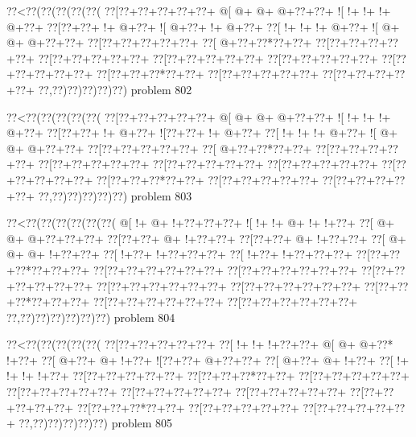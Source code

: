 \vbox{\vbox{\goo
\0??<\0??(\0??(\0??(\0??(\0??(
\0??[\0??+\0??+\0??+\0??+\0??+
\- @[\- @+\- @+\- @+\0??+\0??+
\- ![\- !+\- !+\- !+\- @+\0??+
\0??[\0??+\0??+\- !+\- @+\0??+
\- ![\- @+\0??+\- !+\- @+\0??+
\0??[\- !+\- !+\- !+\- @+\0??+
\- ![\- @+\- @+\- @+\0??+\0??+
\0??[\0??+\0??+\0??+\0??+\0??+
\0??[\- @+\0??+\0??*\0??+\0??+
\0??[\0??+\0??+\0??+\0??+\0??+
\0??[\0??+\0??+\0??+\0??+\0??+
\0??[\0??+\0??+\0??+\0??+\0??+
\0??[\0??+\0??+\0??+\0??+\0??+
\0??[\0??+\0??+\0??+\0??+\0??+
\0??[\0??+\0??+\0??*\0??+\0??+
\0??[\0??+\0??+\0??+\0??+\0??+
\0??[\0??+\0??+\0??+\0??+\0??+
\0??,\0??)\0??)\0??)\0??)\0??)
}
\hfil problem 802\hfil\break
}

\vbox{\vbox{\goo
\0??<\0??(\0??(\0??(\0??(\0??(
\0??[\0??+\0??+\0??+\0??+\0??+
\- @[\- @+\- @+\- @+\0??+\0??+
\- ![\- !+\- !+\- !+\- @+\0??+
\0??[\0??+\0??+\- !+\- @+\0??+
\- ![\0??+\0??+\- !+\- @+\0??+
\0??[\- !+\- !+\- !+\- @+\0??+
\- ![\- @+\- @+\- @+\0??+\0??+
\0??[\0??+\0??+\0??+\0??+\0??+
\0??[\- @+\0??+\0??*\0??+\0??+
\0??[\0??+\0??+\0??+\0??+\0??+
\0??[\0??+\0??+\0??+\0??+\0??+
\0??[\0??+\0??+\0??+\0??+\0??+
\0??[\0??+\0??+\0??+\0??+\0??+
\0??[\0??+\0??+\0??+\0??+\0??+
\0??[\0??+\0??+\0??*\0??+\0??+
\0??[\0??+\0??+\0??+\0??+\0??+
\0??[\0??+\0??+\0??+\0??+\0??+
\0??,\0??)\0??)\0??)\0??)\0??)
}
\hfil problem 803\hfil\break
}

\vbox{\vbox{\goo
\0??<\0??(\0??(\0??(\0??(\0??(\0??(
\- @[\- !+\- @+\- !+\0??+\0??+\0??+
\- ![\- !+\- !+\- @+\- !+\- !+\0??+
\0??[\- @+\- @+\- @+\0??+\0??+\0??+
\0??[\0??+\0??+\- @+\- !+\0??+\0??+
\0??[\0??+\0??+\- @+\- !+\0??+\0??+
\0??[\- @+\- @+\- @+\- !+\0??+\0??+
\0??[\- !+\0??+\- !+\0??+\0??+\0??+
\0??[\- !+\0??+\- !+\0??+\0??+\0??+
\0??[\0??+\0??+\0??*\0??+\0??+\0??+
\0??[\0??+\0??+\0??+\0??+\0??+\0??+
\0??[\0??+\0??+\0??+\0??+\0??+\0??+
\0??[\0??+\0??+\0??+\0??+\0??+\0??+
\0??[\0??+\0??+\0??+\0??+\0??+\0??+
\0??[\0??+\0??+\0??+\0??+\0??+\0??+
\0??[\0??+\0??+\0??*\0??+\0??+\0??+
\0??[\0??+\0??+\0??+\0??+\0??+\0??+
\0??[\0??+\0??+\0??+\0??+\0??+\0??+
\0??,\0??)\0??)\0??)\0??)\0??)\0??)
}
\hfil problem 804\hfil\break
}

\vbox{\vbox{\goo
\0??<\0??(\0??(\0??(\0??(\0??(
\0??[\0??+\0??+\0??+\0??+\0??+
\0??[\- !+\- !+\- !+\0??+\0??+
\- @[\- @+\- @+\0??*\- !+\0??+
\0??[\- @+\0??+\- @+\- !+\0??+
\- ![\0??+\0??+\- @+\0??+\0??+
\0??[\- @+\0??+\- @+\- !+\0??+
\0??[\- !+\- !+\- !+\- !+\0??+
\0??[\0??+\0??+\0??+\0??+\0??+
\0??[\0??+\0??+\0??*\0??+\0??+
\0??[\0??+\0??+\0??+\0??+\0??+
\0??[\0??+\0??+\0??+\0??+\0??+
\0??[\0??+\0??+\0??+\0??+\0??+
\0??[\0??+\0??+\0??+\0??+\0??+
\0??[\0??+\0??+\0??+\0??+\0??+
\0??[\0??+\0??+\0??*\0??+\0??+
\0??[\0??+\0??+\0??+\0??+\0??+
\0??[\0??+\0??+\0??+\0??+\0??+
\0??,\0??)\0??)\0??)\0??)\0??)
}
\hfil problem 805\hfil\break
}

